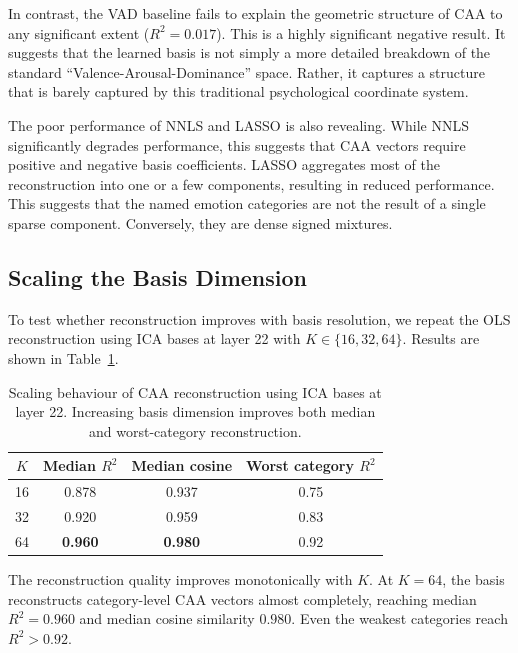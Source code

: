 \documentclass[12pt,twoside]{report}
\begin{document}
In contrast, the VAD baseline fails to explain the geometric structure of CAA to any significant extent ($R^2 = 0.017$). This is a highly significant negative result. It suggests that the learned basis is not simply a more detailed breakdown of the standard ``Valence-Arousal-Dominance'' space. Rather, it captures a structure that is barely captured by this traditional psychological coordinate system.

The poor performance of NNLS and LASSO is also revealing. While NNLS significantly degrades performance, this suggests that CAA vectors require positive and negative basis coefficients. LASSO aggregates most of the reconstruction into one or a few components, resulting in reduced performance. This suggests that the named emotion categories are not the result of a single sparse component. Conversely, they are dense signed mixtures.

\subsection{Scaling the Basis Dimension}
\label{sec:emotion_code:caa_basis_decomposition:scaling}

To test whether reconstruction improves with basis resolution, we repeat the OLS reconstruction using ICA bases at layer 22 with $K\in\{16,32,64\}$. Results are shown in Table~\ref{tab:k-scaling-caa-reconstruction}.

\begin{table}[H]
\centering
\begin{tabular}{c c c c}
\toprule
$K$ & Median $R^2$ & Median cosine & Worst category $R^2$ \\
\midrule
16 & 0.878 & 0.937 & 0.75 \\
32 & 0.920 & 0.959 & 0.83 \\
64 & \textbf{0.960} & \textbf{0.980} & 0.92 \\
\bottomrule
\end{tabular}
\caption{Scaling behaviour of CAA reconstruction using ICA bases at layer 22. Increasing basis dimension improves both median and worst-category reconstruction. }
\label{tab:k-scaling-caa-reconstruction}
\end{table}

The reconstruction quality improves monotonically with $K$.
At $K=64$, the basis reconstructs category-level CAA vectors almost completely, reaching median $R^2=0.960$ and median cosine similarity $0.980$. Even the weakest categories reach $R^2>0.92$.
\end{document}

